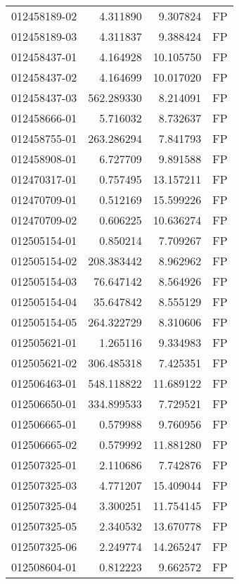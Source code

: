 \begin{tabular}{lrrl}
012458189-02 &    4.311890 &       9.307824 &   FP \\
012458189-03 &    4.311837 &       9.388424 &   FP \\
012458437-01 &    4.164928 &      10.105750 &   FP \\
012458437-02 &    4.164699 &      10.017020 &   FP \\
012458437-03 &  562.289330 &       8.214091 &   FP \\
012458666-01 &    5.716032 &       8.732637 &   FP \\
012458755-01 &  263.286294 &       7.841793 &   FP \\
012458908-01 &    6.727709 &       9.891588 &   FP \\
012470317-01 &    0.757495 &      13.157211 &   FP \\
012470709-01 &    0.512169 &      15.599226 &   FP \\
012470709-02 &    0.606225 &      10.636274 &   FP \\
012505154-01 &    0.850214 &       7.709267 &   FP \\
012505154-02 &  208.383442 &       8.962962 &   FP \\
012505154-03 &   76.647142 &       8.564926 &   FP \\
012505154-04 &   35.647842 &       8.555129 &   FP \\
012505154-05 &  264.322729 &       8.310606 &   FP \\
012505621-01 &    1.265116 &       9.334983 &   FP \\
012505621-02 &  306.485318 &       7.425351 &   FP \\
012506463-01 &  548.118822 &      11.689122 &   FP \\
012506650-01 &  334.899533 &       7.729521 &   FP \\
012506665-01 &    0.579988 &       9.760956 &   FP \\
012506665-02 &    0.579992 &      11.881280 &   FP \\
012507325-01 &    2.110686 &       7.742876 &   FP \\
012507325-03 &    4.771207 &      15.409044 &   FP \\
012507325-04 &    3.300251 &      11.754145 &   FP \\
012507325-05 &    2.340532 &      13.670778 &   FP \\
012507325-06 &    2.249774 &      14.265247 &   FP \\
012508604-01 &    0.812223 &       9.662572 &   FP \\

\end{tabular}
